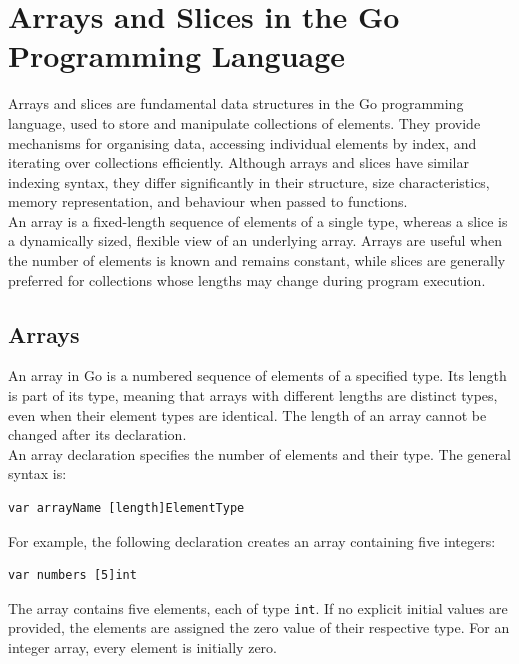 \section{Arrays and Slices in the Go Programming Language}

Arrays and slices are fundamental data structures in the Go programming language, used to store and manipulate collections of elements. They provide mechanisms for organising data, accessing individual elements by index, and iterating over collections efficiently. Although arrays and slices have similar indexing syntax, they differ significantly in their structure, size characteristics, memory representation, and behaviour when passed to functions.\\

An array is a fixed-length sequence of elements of a single type, whereas a slice is a dynamically sized, flexible view of an underlying array. Arrays are useful when the number of elements is known and remains constant, while slices are generally preferred for collections whose lengths may change during program execution.

\subsection{Arrays}

An array in Go is a numbered sequence of elements of a specified type. Its length is part of its type, meaning that arrays with different lengths are distinct types, even when their element types are identical. The length of an array cannot be changed after its declaration.\\

An array declaration specifies the number of elements and their type. The general syntax is:

\begin{lstlisting}
var arrayName [length]ElementType
\end{lstlisting}

For example, the following declaration creates an array containing five integers:

\begin{lstlisting}
var numbers [5]int
\end{lstlisting}

The array contains five elements, each of type \texttt{int}. If no explicit initial values are provided, the elements are assigned the zero value of their respective type. For an integer array, every element is initially zero.

